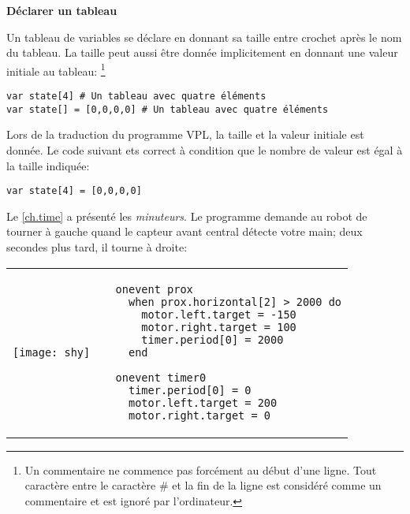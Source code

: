 \textbf{\large Déclarer un tableau}

Un tableau de variables se déclare en donnant sa taille entre crochet après le nom du tableau.
La taille peut aussi être donnée implicitement en donnant une valeur initiale au tableau:
\footnote{Un commentaire ne commence pas forcément au début d'une ligne.
Tout caractère entre le caractère \# et la fin de la ligne est considéré comme un commentaire et est ignoré par l'ordinateur.}

\begin{footnotesize}
\begin{verbatim}
var state[4] # Un tableau avec quatre éléments
var state[] = [0,0,0,0] # Un tableau avec quatre éléments
\end{verbatim}
\end{footnotesize}

Lors de la traduction du programme VPL, la taille et la valeur initiale est donnée.
Le code suivant ets correct à condition que le nombre de valeur est égal à la taille indiquée:

\begin{footnotesize}
\begin{verbatim}
var state[4] = [0,0,0,0]
\end{verbatim}
\end{footnotesize}

\newpage


Le \cref{ch.time} a présenté les \emph{minuteurs}.
Le programme  demande au robot de tourner à gauche quand le capteur avant central
détecte votre main; deux secondes plus tard, il tourne à droite:

\begin{center}
\begin{tabular}{ll}
\texttt{[image: shy]} &
\begin{minipage}[b]{.5\textwidth}
\begin{footnotesize}
\begin{verbatim}
  onevent prox
    when prox.horizontal[2] > 2000 do
      motor.left.target = -150
      motor.right.target = 100
      timer.period[0] = 2000
    end
  
  onevent timer0
    timer.period[0] = 0
    motor.left.target = 200
    motor.right.target = 0
\end{verbatim}
\end{footnotesize}
\end{minipage}
\end{tabular}
\end{center}


